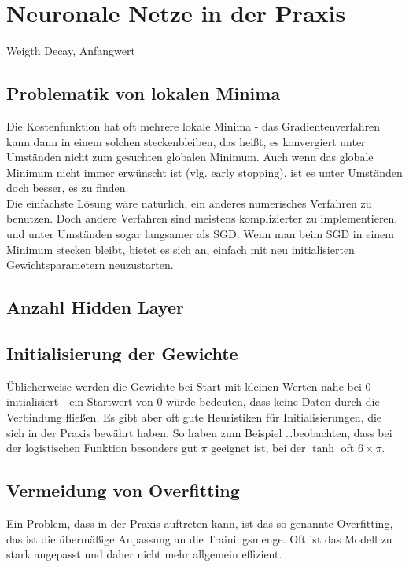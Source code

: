 \section{Neuronale Netze in der Praxis}
Weigth Decay, Anfangwert

\subsection{Problematik von lokalen Minima}
Die Kostenfunktion hat oft mehrere lokale Minima - das Gradientenverfahren kann dann in einem solchen steckenbleiben, das heißt, es konvergiert unter Umständen nicht zum gesuchten globalen Minimum. Auch wenn das globale Minimum nicht immer erwünscht ist (vlg. early stopping), ist es unter Umständen doch besser, es zu finden.\\
Die einfachste Lösung wäre natürlich, ein anderes numerisches Verfahren zu benutzen. Doch andere Verfahren sind meistens komplizierter zu implementieren, und unter Umständen sogar langsamer als SGD. Wenn man beim SGD in einem Minimum stecken bleibt, bietet es sich an, einfach mit neu initialisierten Gewichtsparametern neuzustarten.

\subsection{Anzahl Hidden Layer}

\subsection{Initialisierung der Gewichte}
Üblicherweise werden die Gewichte bei Start mit kleinen Werten nahe bei $0$ initialisiert - ein Startwert von $0$ würde bedeuten, dass keine Daten durch die Verbindung fließen. Es gibt aber oft gute Heuristiken für Initialisierungen, die sich in der Praxis bewährt haben. So haben zum Beispiel \ldots beobachten, dass bei der logistischen Funktion besonders gut $\pi$ geeignet ist, bei der $\tanh$ oft $6 \times \pi$.
 

\subsection{Vermeidung von Overfitting}
Ein Problem, dass in der Praxis auftreten kann, ist das so genannte Overfitting, das ist die übermäßige Anpassung an die Trainingsmenge. Oft ist das Modell zu stark angepasst und daher nicht mehr allgemein effizient.\\

